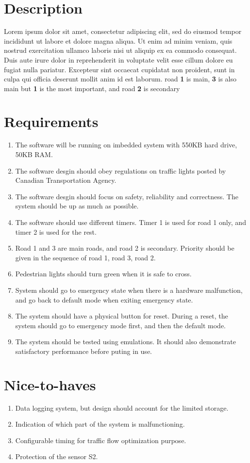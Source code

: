 \documentclass[letterpaper]{article}
\begin{document}
\section{Description}
Lorem ipsum dolor sit amet, consectetur adipiscing elit, sed do eiusmod tempor
incididunt ut labore et dolore magna aliqua. Ut enim ad minim veniam, quis
nostrud exercitation ullamco laboris nisi ut aliquip ex ea commodo consequat.
Duis aute irure dolor in reprehenderit in voluptate velit esse cillum dolore eu
fugiat nulla pariatur. Excepteur sint occaecat cupidatat non proident, sunt in
culpa qui officia deserunt mollit anim id est laborum.
road \textbf{1} is main, \textbf{3} is also main but \textbf{1} is the most important, and
road \textbf{2} is secondary


\section{Requirements}
\begin{enumerate}
 \item The software will be running on imbedded system with 550KB hard drive, 50KB RAM.
 \item The software desgin should obey regulations on traffic lights posted by Canadian Transportation Agency.
 \item The software desgin should focus on safety, reliability and correctness. The system should be up as much as possible.
 \item The software should use different timers. Timer 1 is used for road 1 only, and timer 2 is used for the rest.
 \item Road 1 and 3 are main roads, and road 2 is secondary. Priority should be given in the sequence of road 1, road 3, road 2.
 \item Pedestrian lights should turn green when it is safe to cross.
 \item System should go to emergency state when there is a hardware malfunction, and go back to default mode when exiting emergency state.
 \item The system should have a physical button for reset. During a reset, the system should go to emergency mode first, and then the default mode.
 \item The system should be tested using emulations. It should also demonstrate satisfactory performance before puting in use.
\end{enumerate}

\section{Nice-to-haves}
\begin{enumerate}
 \item Data logging system, but design should account for the limited storage.
 \item Indication of which part of the system is malfunctioning.
 \item Configurable timing for traffic flow optimization purpose.
 \item Protection of the sensor S2.
\end{enumerate}
\end{document}
